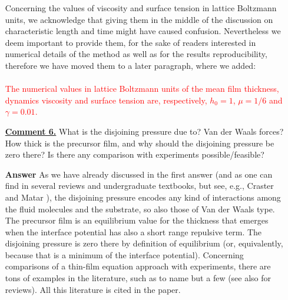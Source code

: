 \documentclass[12pt,english]{article}
\begin{document}
\begin{itemize}
{Concerning the values of viscosity and surface tension in lattice Boltzmann units, 
we acknowledge that giving them in the middle of the discussion on characteristic length and time might  
have caused confusion. Nevertheless we deem important to provide them, for the sake of readers interested 
in numerical details of the method as well as for the results reproducibility, therefore we have moved them 
to a later paragraph, where we added: \\
\\
\textcolor{red}{The numerical values in lattice Boltzmann units of the 
mean film thickness, dynamics viscosity and surface tension are, respectively, $h_0=1$, $\mu=1/6$
and $\gamma=0.01$.}
}


\item[ \textbf{\underline{Comment 6.}}]
{ 
What is the disjoining pressure due to? 
Van der Waals forces? 
How thick is the precursor film, and why should the disjoining pressure be zero there?
Is there any comparison with experiments possible/feasible?
}

\item[ \textbf{{Answer}}]
{
As we have already discussed in the first answer (and as one can find 
in several reviews and undergraduate textbooks, but see, e.g., Craster 
and Matar \cite{craster2009dynamics}), the disjoining pressure encodes 
any kind of interactions among the fluid molecules and the substrate, so 
also those of Van der Waals type. The precursor film is an equilibrium value for the thickness that emerges when the interface potential has also a short 
range repulsive term. The disjoining pressure is zero there by definition of equilibrium (or, equivalently, because that is a minimum of the interface potential). Concerning comparisons of a thin-film equation approach with 
experiments, there are tons of examples in the literature, such as 
\cite{becker2003complex,fetzer2005new,PhysRevLett.99.114503} to name but a few (see also \cite{craster2009dynamics,RevModPhys.81.739} for reviews). All this literature is cited in the paper.
}

\end{itemize}




\end{document}
